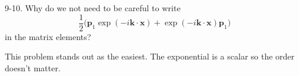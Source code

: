 \documentclass[12pt]{article}
\begin{document}
9-10.
Why do we not need to be careful to write
\begin{equation*}
\frac{1}{2}
\big(
\mathbf p_1\exp(-i\mathbf k\cdot\mathbf x)
+\exp(-i\mathbf k\cdot\mathbf x)\mathbf p_1
\big)
\end{equation*}
in the matrix elements?

\bigskip
This problem stands out as the easiest.
The exponential is a scalar so the order doesn't matter.
\end{document}
